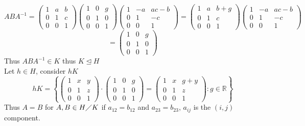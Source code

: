 \documentclass[12pt, letterpaper]{article}
\theoremstyle{definition}
\begin{document}
    \[
    ABA^{-1} = \begin{pmatrix}
    1 & a & b \\
    0 & 1 & c \\
    0 & 0 & 1
    \end{pmatrix} 
    \begin{pmatrix}
    1 & 0 & g \\
    0 & 1 & 0 \\
    0 & 0 & 1
    \end{pmatrix}
    \begin{pmatrix}
    1 & -a & ac - b \\
    0 & 1 & -c \\
    0 & 0 & 1
    \end{pmatrix}
    = \begin{pmatrix}
    1 & a & b+g \\
    0 & 1 & c \\
    0 & 0 & 1
    \end{pmatrix}
    \begin{pmatrix}
    1 & -a & ac - b \\
    0 & 1 & -c \\
    0 & 0 & 1
    \end{pmatrix}
    \]
    \[
    =\begin{pmatrix}
    1 & 0 & g \\
    0 & 1 & 0 \\
    0 & 0 & 1
    \end{pmatrix}
    \]
    Thus $ABA^{-1} \in K$ thus $K \unlhd H$\\
    Let $h \in H$, consider $hK$\\
    \[
    hK = \left\{ \begin{pmatrix}
        1 & x & y \\
        0 & 1 & z \\
        0 & 0 & 1
        \end{pmatrix}
        \cdot
        \begin{pmatrix}
        1 & 0 & g \\
        0 & 1 & 0 \\
        0 & 0 & 1
        \end{pmatrix}=
        \begin{pmatrix}
        1 & x & g+y \\
        0 & 1 & z \\
        0 & 0 & 1
        \end{pmatrix}  : g \in \mathbb{R} \right\}
    \]
    Thus $A=B$ for $A,B \in H \diagup K$ if $a_{12}=b_{12}$ and $a_{23}=b_{23}$, $a_{ij}$ is the $(i,j)$ component.\\
\end{document}
